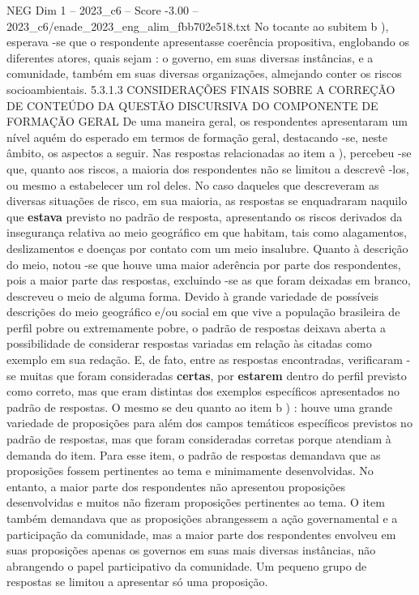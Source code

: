 \begin{textsample}{NEG Dim 1 – 2023\_c6 – Score -3.00 – 2023\_c6/enade\_2023\_eng\_alim\_fbb702e518.txt}
No tocante ao subitem b ), esperava -se que o respondente apresentasse coerência propositiva, englobando os diferentes atores, quais sejam : o governo, em suas diversas instâncias, e a comunidade, também em suas diversas organizações, almejando conter os riscos socioambientais. 5.3.1.3 CONSIDERAÇÕES FINAIS SOBRE A CORREÇÃO DE CONTEÚDO DA QUESTÃO DISCURSIVA DO COMPONENTE DE FORMAÇÃO GERAL De uma maneira geral, os respondentes apresentaram um nível aquém do esperado em termos de formação geral, destacando -se, neste âmbito, os aspectos a seguir.
Nas respostas relacionadas ao item a ), percebeu -se que, quanto aos riscos, a maioria dos respondentes não se limitou a descrevê -los, ou mesmo a estabelecer um rol deles.
No caso daqueles que descreveram as diversas situações de risco, em sua maioria, as respostas se enquadraram naquilo que \textbf{estava} previsto no padrão de resposta, apresentando os riscos derivados da insegurança relativa ao meio geográfico em que habitam, tais como alagamentos, deslizamentos e doenças por contato com um meio insalubre.
Quanto à descrição do meio, notou -se que houve uma maior aderência por parte dos respondentes, pois a maior parte das respostas, excluindo -se as que foram deixadas em branco, descreveu o meio de alguma forma.
Devido à grande variedade de possíveis descrições do meio geográfico e/ou social em que vive a população brasileira de perfil pobre ou extremamente pobre, o padrão de respostas deixava aberta a possibilidade de considerar respostas variadas em relação às citadas como exemplo em sua redação.
E, de fato, entre as respostas encontradas, verificaram -se muitas que foram consideradas \textbf{certas}, por \textbf{estarem} dentro do perfil previsto como correto, mas que eram distintas dos exemplos específicos apresentados no padrão de respostas.
O mesmo se deu quanto ao item b ) : houve uma grande variedade de proposições para além dos campos temáticos específicos previstos no padrão de respostas, mas que foram consideradas corretas porque atendiam à demanda do item.
Para esse item, o padrão de respostas demandava que as proposições fossem pertinentes ao tema e minimamente desenvolvidas.
No entanto, a maior parte dos respondentes não apresentou proposições desenvolvidas e muitos não fizeram proposições pertinentes ao tema.
O item também demandava que as proposições abrangessem a ação governamental e a participação da comunidade, mas a maior parte dos respondentes envolveu em suas proposições apenas os governos em suas mais diversas instâncias, não abrangendo o papel participativo da comunidade.
Um pequeno grupo de respostas se limitou a apresentar só uma proposição.

\end{textsample}
